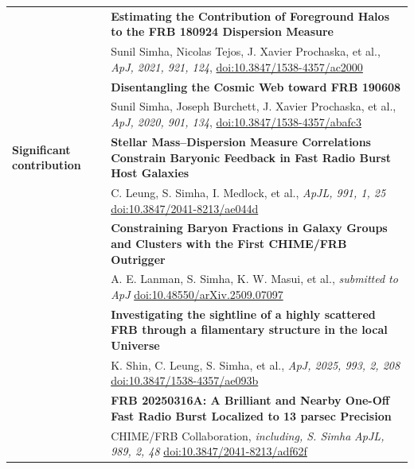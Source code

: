 \documentclass[letterpaper, 11pt]{article}
\begin{document}
\begin{longtable}{p{1.3in}p{4.8in}}
& \textbf{Estimating the Contribution of Foreground Halos to the FRB 180924 Dispersion Measure} \\
& Sunil Simha, Nicolas Tejos, J. Xavier Prochaska, et al., \textit{ApJ, 2021, 921, 124}, \href{https://ui.adsabs.harvard.edu/link_gateway/2021ApJ...921..134S/doi:10.3847/1538-4357/ac2000}{doi:10.3847/1538-4357/ac2000}\\

& \textbf{Disentangling the Cosmic Web toward FRB 190608} \\
& Sunil Simha, Joseph Burchett, J. Xavier Prochaska, et al., \textit{ApJ, 2020, 901, 134}, \href{https://ui.adsabs.harvard.edu/link_gateway/2020ApJ...901..134S/doi:10.3847/1538-4357/abafc3}{doi:10.3847/1538-4357/abafc3}\\


\textbf{Significant contribution} & \textbf{Stellar Mass–Dispersion Measure Correlations Constrain Baryonic Feedback in Fast Radio Burst Host Galaxies}\\
& C. Leung, S. Simha, I. Medlock, et al., \textit{ApJL, 991, 1, 25} \href{https://ui.adsabs.harvard.edu/link_gateway/2025ApJ...991L..25L/doi:10.3847/2041-8213/ae044d}{doi:10.3847/2041-8213/ae044d}\\

& \textbf{Constraining Baryon Fractions in Galaxy Groups and Clusters with the First CHIME/FRB Outrigger}\\
& A. E. Lanman, S. Simha, K. W. Masui, et al., \textit{submitted to ApJ} \href{https://ui.adsabs.harvard.edu/link_gateway/2025arXiv250907097L/doi:10.48550/arXiv.2509.07097}{doi:10.48550/arXiv.2509.07097}\\

& \textbf{Investigating the sightline of a highly scattered FRB through a filamentary structure in the local Universe}\\
& K. Shin, C. Leung, S. Simha, et al., \textit{ApJ, 2025, 993, 2, 208} \href{https://ui.adsabs.harvard.edu/link_gateway/2025ApJ...993..208S/doi:10.3847/1538-4357/ae093b}{doi:10.3847/1538-4357/ae093b}\\

& \textbf{FRB 20250316A: A Brilliant and Nearby One-Off Fast Radio Burst Localized to 13 parsec Precision }\\
& CHIME/FRB Collaboration, \textit{including, S. Simha} \textit{ApJL, 989, 2, 48} \href{https://ui.adsabs.harvard.edu/link_gateway/2025ApJ...989L..48C/doi:10.3847/2041-8213/adf62f}{doi:10.3847/2041-8213/adf62f}\\


\end{longtable}
\end{document}
